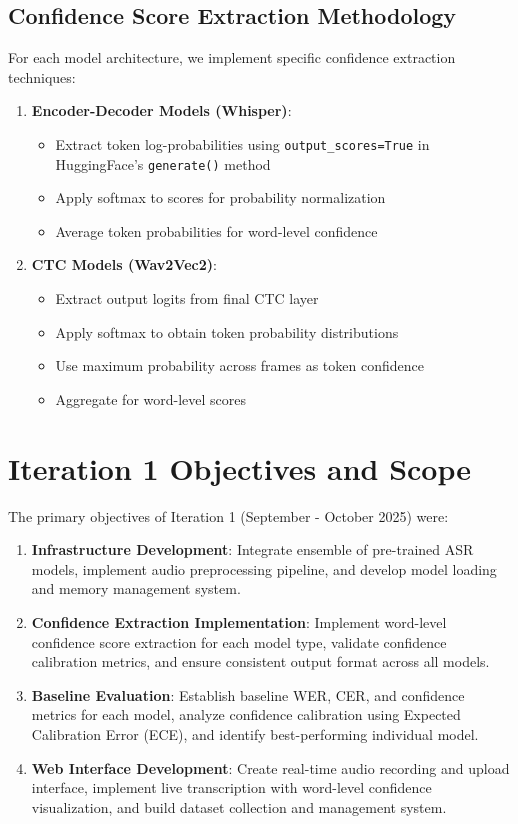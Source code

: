 \subsection{Confidence Score Extraction Methodology}

For each model architecture, we implement specific confidence extraction techniques:

\begin{enumerate}
    \item \textbf{Encoder-Decoder Models (Whisper)}:
    \begin{itemize}
        \item Extract token log-probabilities using \texttt{output\_scores=True} in HuggingFace's \texttt{generate()} method
        \item Apply softmax to scores for probability normalization
        \item Average token probabilities for word-level confidence
    \end{itemize}
    
    \item \textbf{CTC Models (Wav2Vec2)}:
    \begin{itemize}
        \item Extract output logits from final CTC layer
        \item Apply softmax to obtain token probability distributions
        \item Use maximum probability across frames as token confidence
        \item Aggregate for word-level scores
    \end{itemize}
\end{enumerate}

\section{Iteration 1 Objectives and Scope}

The primary objectives of Iteration 1 (September - October 2025) were:

\begin{enumerate}
    \item \textbf{Infrastructure Development}: Integrate ensemble of pre-trained ASR models, implement audio preprocessing pipeline, and develop model loading and memory management system.
    \item \textbf{Confidence Extraction Implementation}: Implement word-level confidence score extraction for each model type, validate confidence calibration metrics, and ensure consistent output format across all models.
    \item \textbf{Baseline Evaluation}: Establish baseline WER, CER, and confidence metrics for each model, analyze confidence calibration using Expected Calibration Error (ECE), and identify best-performing individual model.
    \item \textbf{Web Interface Development}: Create real-time audio recording and upload interface, implement live transcription with word-level confidence visualization, and build dataset collection and management system.
\end{enumerate}

